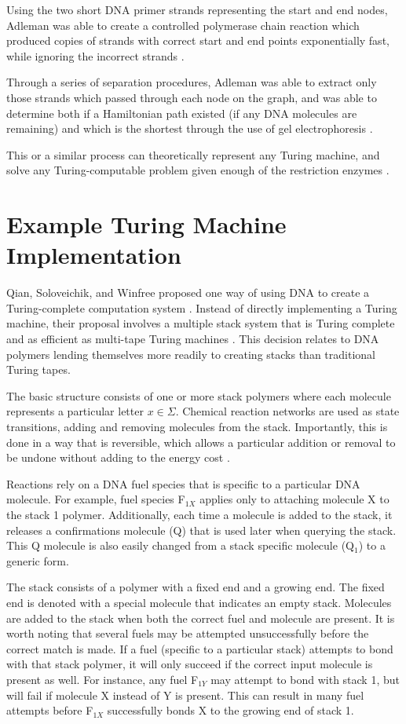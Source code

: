 \documentclass[twocolumn]{article}
\begin{document}
Using the two short DNA primer strands representing the start and end
nodes, Adleman was able to create a controlled polymerase chain
reaction which produced copies of strands with correct start and end
points exponentially fast, while ignoring the incorrect strands
\cite{adleman_98}.

Through a series of separation procedures, Adleman was able to extract
only those strands which passed through each node on the graph, and
was able to determine both if a Hamiltonian path existed (if any DNA
molecules are remaining) and which is the shortest through the use of
gel electrophoresis \cite{adleman_94}.

This or a similar process can theoretically
represent any Turing machine, and solve any Turing-computable problem
given enough of the restriction enzymes \cite{wilhelm}.

\section{Example Turing Machine Implementation}
Qian, Soloveichik, and Winfree proposed one way of using DNA to
create a Turing-complete computation system \cite{qian}. Instead of directly
implementing a Turing machine, their proposal involves a multiple
stack system that is Turing complete and as efficient as multi-tape
Turing machines \cite{minsky}. This decision relates to DNA polymers lending
themselves more readily to creating stacks than traditional Turing
tapes.

The basic structure consists of one or more stack polymers where each
molecule represents a particular letter $x \in \Sigma$. Chemical reaction
networks are used as state transitions, adding and removing molecules
from the stack. Importantly, this is done in a way that is reversible,
which allows a particular addition or removal to be undone without
adding to the energy cost \cite{qian}.

Reactions rely on a DNA fuel species that is specific to a particular
DNA molecule. For example, fuel species F$_{1X}$ applies only to attaching
molecule X to the stack 1 polymer. Additionally, each time a molecule
is added to the stack, it releases a confirmations molecule (Q) that
is used later when querying the stack. This Q molecule is also easily
changed from a stack specific molecule (Q$_1$) to a generic form.

The stack consists of a polymer with a fixed end and a growing end.
The fixed end is denoted with a special molecule that indicates an
empty stack. Molecules are added to the stack when both the correct
fuel and molecule are present. It is worth noting that several fuels
may be attempted unsuccessfully before the correct match is made. If a
fuel (specific to a particular stack) attempts to bond with that stack
polymer, it will only succeed if the correct input molecule is present
as well. For instance, any fuel F$_{1Y}$ may attempt to bond with stack 1,
but will fail if molecule X instead of Y is present. This can result
in many fuel attempts before F$_{1X}$ successfully bonds X to the growing
end of stack 1.
\end{document}
